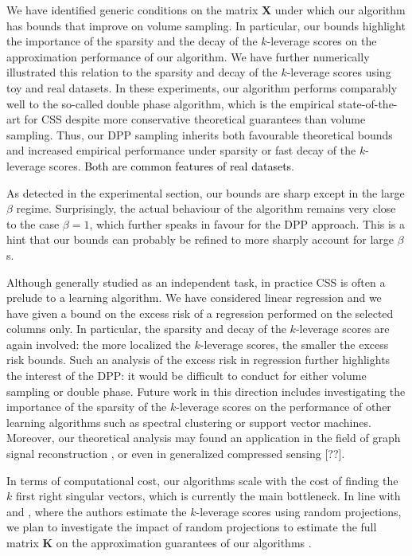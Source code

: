 \documentclass[twoside,11pt]{book}
\newcommand{\rev}[1]{\textcolor{black}{#1}}
\numberwithin{theorem}{chapter}
\numberwithin{definition}{chapter}
\numberwithin{proposition}{chapter}
\numberwithin{corollary}{chapter}
\numberwithin{example}{chapter}
\numberwithin{lemma}{chapter}
\numberwithin{assumption}{chapter}
\numberwithin{equation}{chapter}
\numberwithin{figure}{chapter}
\begin{document}
We have identified generic conditions on the matrix $\bm{X}$ under which our algorithm has bounds that improve on volume sampling. In particular, our bounds highlight the importance of the sparsity and the decay of the $k$-leverage scores on the approximation performance of our algorithm. We have further numerically illustrated this relation to the sparsity and decay of the $k$-leverage scores using toy and real datasets. In these experiments, our algorithm performs comparably well to the so-called double phase algorithm, which is the empirical state-of-the-art for CSS despite more conservative theoretical guarantees than volume sampling. Thus, our DPP sampling inherits both favourable theoretical bounds and increased empirical performance under sparsity or fast decay of the $k$-leverage scores. \rev{Both are common features of real datasets}.

As detected in the experimental section, our bounds are sharp except in the large $\beta$ regime. Surprisingly, the actual behaviour of the algorithm remains very close to the case $\beta=1$, which further speaks in favour for the DPP approach. This is a hint that our bounds can probably be refined to more sharply account for large $\beta$s.


Although generally studied as an independent task, in practice CSS is often a prelude to a learning algorithm. We have considered linear regression and we have given a bound on the excess risk of a regression performed on the selected columns only. In particular, the sparsity and decay of the $k$-leverage scores are again involved: the more localized the $k$-leverage scores, the smaller the excess risk bounds. Such an analysis of the excess risk in regression further highlights the interest of the DPP: it would be difficult to conduct for either volume sampling or double phase. Future work in this direction includes investigating the importance of the sparsity of the $k$-leverage scores on the performance of other learning algorithms such as spectral clustering or support vector machines. Moreover, our theoretical analysis may found an application in the field of graph signal reconstruction \citep{TrAmBa17,PuTrGrVa18}, or even in generalized compressed sensing [??].


In terms of computational cost, our algorithms scale with the cost of finding the $k$ first right singular vectors, which is currently the main bottleneck. In line with \cite{DMMW12} and \cite{BoDrMI11}, where the authors estimate the $k$-leverage scores using random projections, we plan to investigate the impact of random projections to estimate the full matrix $\bm{K}$ on the approximation guarantees of our algorithms \citep{MaZo08}.
\end{document}
